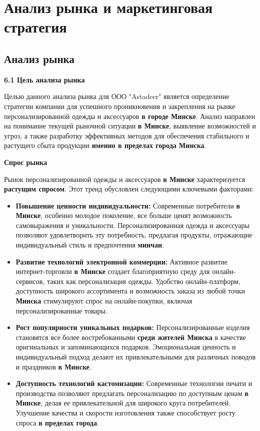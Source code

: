 \section{Анализ рынка и маркетинговая стратегия}

\subsection{Анализ рынка}

\textbf{6.1 Цель анализа рынка}

Целью данного анализа рынка для ООО "Astadeer" является определение стратегии компании для успешного проникновения и закрепления на рынке персонализированной одежды и аксессуаров \textbf{в городе Минске}. Анализ направлен на понимание текущей рыночной ситуации \textbf{в Минске}, выявление возможностей и угроз, а также разработку эффективных методов для обеспечения стабильного и растущего сбыта продукции \textbf{именно в пределах города Минска}.

\vspace{0.3cm}

\textbf{Спрос рынка}

Рынок персонализированной одежды и аксессуаров \textbf{в Минске} характеризуется \textbf{растущим спросом}.  Этот тренд обусловлен следующими ключевыми факторами:

\begin{itemize}
    \item \textbf{Повышение ценности индивидуальности:}  Современные потребители \textbf{в Минске}, особенно молодое поколение, все больше ценят возможность самовыражения и уникальности. Персонализированная одежда и аксессуары позволяют удовлетворить эту потребность, предлагая продукты, отражающие индивидуальный стиль и предпочтения \textbf{минчан}.
    \item \textbf{Развитие технологий электронной коммерции:}  Активное развитие интернет-торговли \textbf{в Минске} создает благоприятную среду для онлайн-сервисов, таких как персонализация одежды.  Удобство онлайн-платформ, доступность широкого ассортимента и возможность заказа из любой точки \textbf{Минска} стимулируют спрос на онлайн-покупки, включая персонализированные товары.
    \item \textbf{Рост популярности уникальных подарков:}  Персонализированные изделия становятся все более востребованными \textbf{среди жителей Минска} в качестве оригинальных и запоминающихся подарков.  Эмоциональная ценность и индивидуальный подход делают их привлекательными для различных поводов и праздников \textbf{в Минске}.
    \item \textbf{Доступность технологий кастомизации:}  Современные технологии печати и производства позволяют предлагать персонализацию по доступным ценам \textbf{в Минске}, делая ее привлекательной для широкого круга потребителей.  Улучшение качества и скорости изготовления также способствует росту спроса \textbf{в пределах города}.
\end{itemize}

